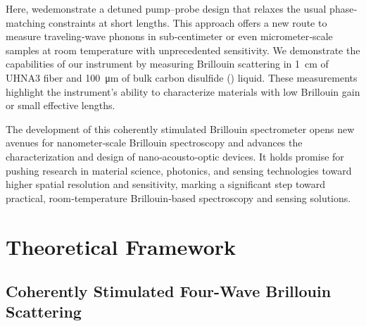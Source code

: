 Here, wedemonstrate a detuned pump–probe design that relaxes the usual phase‐matching constraints at short lengths. This approach offers a new route to measure traveling‐wave phonons in sub‐centimeter or even micrometer‐scale samples at room temperature with unprecedented sensitivity. We demonstrate the capabilities of our instrument by measuring Brillouin scattering in \SI{1}{\centi\meter} of \ac{UHNA3} fiber and \SI{100}{\micro\meter} of bulk carbon disulfide () liquid. These measurements highlight the instrument’s ability to characterize materials with low Brillouin gain or small effective lengths.

The development of this coherently stimulated Brillouin spectrometer opens new avenues for nanometer‐scale Brillouin spectroscopy and advances the characterization and design of nano‐acousto‐optic devices. It holds promise for pushing research in material science, photonics, and sensing technologies toward higher spatial resolution and sensitivity, marking a significant step toward practical, room‐temperature Brillouin‐based spectroscopy and sensing solutions.

\section{Theoretical Framework}
\label{Theoretical Framework}

\subsection{Coherently Stimulated Four-Wave Brillouin Scattering}
\label{Theoretical Framework:Coherently stimulated five-wave Brillouin scattering}

